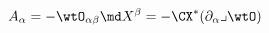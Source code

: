 \begin{equation}\label{Aalpha}
 A_{\alpha}=-\wtO_{\alpha\beta}\md
 X^{\beta}=-\CX^{\ast}(\partial_{\alpha}\lrcorner\wtO) \end{equation}

